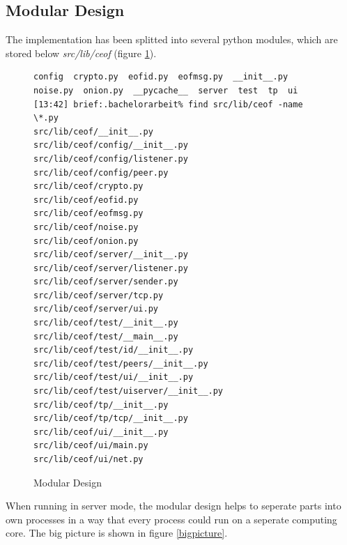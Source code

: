 \subsection{Modular Design}
The implementation has been splitted into several python
modules, which are stored below \textit{src/lib/ceof} 
(figure \ref{pythonmodules}).
\begin{figure}[htb]
\caption{Modular Design}
\label{pythonmodules}
\begin{verbatim}
config  crypto.py  eofid.py  eofmsg.py  __init__.py  noise.py  onion.py  __pycache__  server  test  tp  ui
[13:42] brief:.bachelorarbeit% find src/lib/ceof -name \*.py
src/lib/ceof/__init__.py
src/lib/ceof/config/__init__.py
src/lib/ceof/config/listener.py
src/lib/ceof/config/peer.py
src/lib/ceof/crypto.py
src/lib/ceof/eofid.py
src/lib/ceof/eofmsg.py
src/lib/ceof/noise.py
src/lib/ceof/onion.py
src/lib/ceof/server/__init__.py
src/lib/ceof/server/listener.py
src/lib/ceof/server/sender.py
src/lib/ceof/server/tcp.py
src/lib/ceof/server/ui.py
src/lib/ceof/test/__init__.py
src/lib/ceof/test/__main__.py
src/lib/ceof/test/id/__init__.py
src/lib/ceof/test/peers/__init__.py
src/lib/ceof/test/ui/__init__.py
src/lib/ceof/test/uiserver/__init__.py
src/lib/ceof/tp/__init__.py
src/lib/ceof/tp/tcp/__init__.py
src/lib/ceof/ui/__init__.py
src/lib/ceof/ui/main.py
src/lib/ceof/ui/net.py
\end{verbatim}
\end{figure}
When running in server mode, the modular design helps
to seperate parts into own processes in a way that
every process could run on a seperate computing
core. The big picture is shown in figure \ref{bigpicture}.
